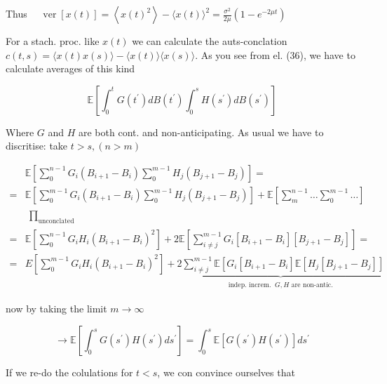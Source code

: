 Thus $\quad \operatorname{ver}[x(t)]=\left
\langle x(t)^{2}\right
\rangle-\langle x(t)\rangle^{2}=\frac{\sigma^{2}}{2 \mu}\left(1-e^{-2 \mu t}\right)$

For a stach. proc. like $x(t)$ we can calculate the auts-conclation $c(t, s)=\langle x(t) x(s)\rangle-\langle x(t)\rangle\langle x(s)\rangle$.
As you see from el. (36), we have to calculate averages of this kind


\begin{equation*}
\mathbb{E}\left[
\int_{0}^{t} G
\left(t^{\prime}\right) d B
\left(t^{\prime}\right) \int_{0}^{s} H
\left(s^{\prime}\right) d B
\left(s^{\prime}\right)\right] \tag{38}
\end{equation*}


Where $G$ and $H$ are both cont. and non-anticipating. As usual we have to discritise: take $t>s,(n>m)$

$$
 \begin{aligned}
& \mathbb{E}\left[
\sum_{0}^{n-1} G_{i}\left(B_{i+1}-B_{i}\right) \sum_{0}^{m-1} H_{j}\left(B_{j+1}-B_{j}\right)\right]=
 \\
= & \mathbb{E}\left[
\sum_{0}^{m-1} G_{i}\left(B_{i+1}-B_{i}\right) \sum_{0}^{m-1} H_{j}\left(B_{j+1}-B_{j}\right)\right]+\mathbb{E}\left[
\sum_{m}^{n-1} \ldots \sum_{0}^{m-1} \ldots\right] \\
& \begin{array}{r}
\prod_{\text {unconclated }} 
\end{array} \\
= & \mathbb{E}\left[
\sum_{0}^{n-1} G_{i} H_{i}\left(B_{i+1}-B_{i}\right)^{2}\right]+2 \mathbb{E}\left[
\sum_{i \neq j}^{m-1} G_{i}\left[B_{i+1}-B_{i}\right] \left[B_{j+1}-B_{j}\right]\right]=
 \\
= & E
\left[
\sum_{0}^{m-1} G_{i} H_{i}\left(B_{i+1}-B_{i}\right)^{2}\right]+\underbrace{2 \sum_{i \neq j}^{m-1} \mathbb{E}\left[G_{i}\left[B_{i+1}-B_{i}\right] \mathbb{E}\left[H_{j}\left[B_{j+1}-B_{j}\right]\right]
\right.}_{\substack{\text { indep. increm. } \ G, H \text { are non-antic. }}}
\end{aligned}
$$ 

now by taking the limit $m \rightarrow \infty$

$$ 
\longrightarrow \mathbb{E}\left[
\int_{0}^{s} G
\left(s^{\prime}\right) H
\left(s^{\prime}\right) d s^{\prime}\right]=\int_{0}^{s} \mathbb{E}\left[G
\left(s^{\prime}\right) H
\left(s^{\prime}\right)\right] d s^{\prime}
$$ 

If we re-do the colulations for $t<s$, we con convince ourselves that



